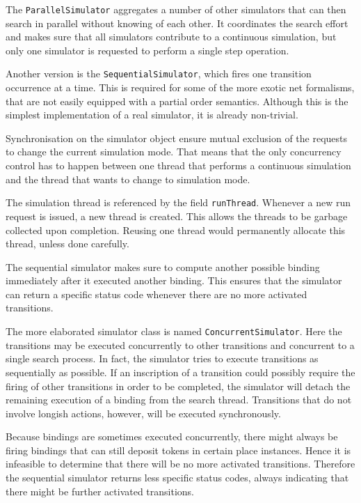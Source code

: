 The \texttt{ParallelSimulator} aggregates a number of other simulators
that can then search in parallel without knowing of each other.
It coordinates the search effort and makes sure that all simulators
contribute to a continuous simulation, but only one simulator
is requested to perform a single step operation.

Another version is the \texttt{SequentialSimulator}, which
fires one transition occurrence at a time. This is required for
some of the more exotic net formalisms, that are not easily
equipped with a partial order semantics. Although this is the simplest
implementation of a real simulator, it is already non-trivial.

Synchronisation on the simulator object ensure mutual
exclusion of the requests to change the current simulation
mode. That means that the only concurrency control has to happen 
between one thread that performs a continuous simulation
and the thread that wants to change to simulation mode.

The simulation thread is referenced by the field
\texttt{runThread}. Whenever a new run request is issued,
a new thread is created. This allows the threads to be garbage
collected upon completion. Reusing one thread would
permanently allocate this thread, unless done carefully.

The sequential simulator makes sure to compute another 
possible binding immediately after it executed another binding.
This ensures that the simulator can return a specific
status code whenever there are no more activated transitions.

The more elaborated simulator class is named \texttt{ConcurrentSimulator}.
Here the transitions may be executed concurrently to other transitions
and concurrent to a single search process. In fact, the simulator tries
to execute transitions as sequentially as possible. If
an inscription of a transition could possibly require
the firing of other transitions in order to be completed,
the simulator will detach the remaining execution of a binding from the
search thread. Transitions that do not involve longish actions,
however, will be executed synchronously.

Because bindings are sometimes executed concurrently, there might always be 
firing bindings that can still deposit tokens in certain place instances.
Hence it is infeasible to determine that there will be no more
activated transitions. Therefore the sequential simulator returns
less specific status codes, always indicating that there might be further
activated transitions.

